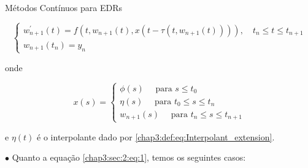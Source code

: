 \documentclass{beamer}
\theoremstyle{plain}
\theoremstyle{definition}
\begin{document}

\begin{frame}{Métodos Contínuos para EDRs}


    \begin{equation}
        \left\{\begin{array}{l}
                w_{n+1}^{\prime}(t)=f(t, w_{n+1}(t), x(t-\tau(t, w_{n+1}(t)))), \quad t_{n} \leq t \leq t_{n+1} \\
                w_{n+1}(t_{n})=y_{n}
        \end{array}\right.
        \label{chap3:sec:2:eq:1}
    \end{equation}

    onde

    $$
    x(s)=\left\{\begin{array}{l}
            \phi(s) \quad \text { para } s \leq t_{0} \\
            \eta(s) \quad \text { para } t_{0} \leq s \leq t_{n} \\
            w_{n+1}(s) \quad \text { para } t_{n} \leq s \leq t_{n+1}
    \end{array}\right.
    $$

    e \(\eta(t)\) é o interpolante dado por \ref{chap3:def:eq:Interpolant_extension}. 

    \phantom{aa} $\bullet$ Quanto a equação \eqref{chap3:sec:2:eq:1}, temos os seguintes casos:

\end{frame}


\end{document}
